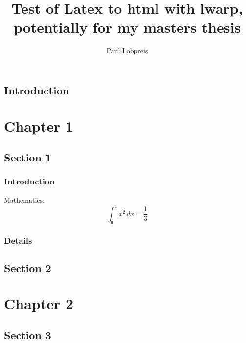 \documentclass{book}
\begin{document}
\title{Test of Latex to html with lwarp, potentially for my masters thesis}
\author{Paul Lobpreis}

\HTMLTitleAfterSection
\maketitle

\label{table-of-contents}

\tableofcontents

\section[index]{Introduction}



\lipsum[1-3]

\chapter[chapter1]{Chapter 1}
\section[section1]{Section 1}
\lipsum[1-3]

\subsection{Introduction}
\lipsum[1-3]

Mathematics:
\[
    \int_0^1 x^2 \, dx = \frac{1}{3}    
\]

\subsection{Details}
\lipsum[4]




\section[section2]{Section 2}
\lipsum[4-7]







\chapter[chapter2]{Chapter 2}
\section[section3]{Section 3}
\end{document}

